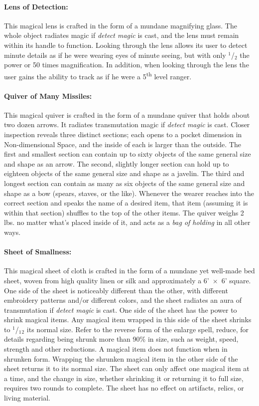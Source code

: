 \begin{multicols}{2}
\paragraph{Lens of Detection:} This magical lens is crafted in the form of a mundane magnifying glass.  The whole object radiates magic if \textit{detect magic} is cast, and the lens must remain within its handle to function.  Looking through the lens allows its user to detect minute details as if he were wearing eyes of minute seeing, but with only $^1$/$_2$ the power or 50 times magnification.  In addition, when looking through the lens the user gains the ability to track as if he were a 5\textsuperscript{th} level ranger.

\paragraph{Quiver of Many Missiles:} This magical quiver is crafted in the form of a mundane quiver that holds about two dozen arrows.  It radiates transmutation magic if \textit{detect magic} is cast.  Closer inspection reveals three distinct sections; each opens to a pocket dimension in Non-dimensional Space, and the inside of each is larger than the outside.  The first and smallest section can contain up to sixty objects of the same general size and shape as an arrow.  The second, slightly longer section can hold up to eighteen objects of the same general size and shape as a javelin.  The third and longest section can contain as many as six objects of the same general size and shape as a bow (spears, staves, or the like).  Whenever the wearer reaches into the correct section and speaks the name of a desired item, that item (assuming it is within that section) shuffles to the top of the other items.  The quiver weighs 2 lbs. no matter what's placed inside of it, and acts as a \textit{bag of holding} in all other ways.

\paragraph{Sheet of Smallness:} This magical sheet of cloth is crafted in the form of a mundane yet well-made bed sheet, woven from high quality linen or silk and approximately a 6'~$\times$~6' square.  One side of the sheet is noticeably different than the other, with different embroidery patterns and/or different colors, and the sheet radiates an aura of transmutation if \textit{detect magic} is cast.  One side of the sheet has the power to shrink magical items.  Any magical item wrapped in this side of the sheet shrinks to $^1$/$_1$$_2$ its normal size.  Refer to the reverse form of the enlarge spell, reduce, for details regarding being shrunk more than 90\% in size, such as weight, speed, strength and other reductions.  A magical item does not function when in shrunken form.  Wrapping the shrunken magical item in the other side of the sheet returns it to its normal size.  The sheet can only affect one magical item at a time, and the change in size, whether shrinking it or returning it to full size, requires two rounds to complete.  The sheet has no effect on artifacts, relics, or living material.


\end{multicols}
